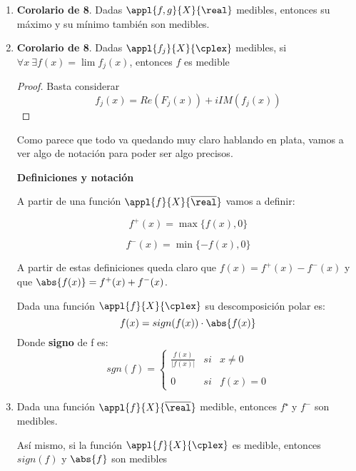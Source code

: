 \documentclass{apuntes}
\begin{document}
\begin{enumerate}
\begin{proof}
\begin{enumerate}
\item $g_2(x) = - \sup\{f_j(x)\}$

\item $g_3(x) = \limsup f_j(x) = \lim_n \sup_{j \geq n}\{f_j(x)\}=\inf_n \sup_{j \geq n}\{f_j(x)\}$ es medible
\end{enumerate}
\end{proof}
\item \textbf{Corolario de 8}. Dadas $\appl{f,g}{X}{\real}$ medibles, entonces su máximo y su mínimo también son medibles.

\item \textbf{Corolario de 8}. Dadas $\appl{f_j}{X}{\cplex}$ medibles, si $\forall x \ \exists f(x)=\lim f_j(x)$, entonces $f$ es medible
\begin{proof}
Basta considerar
\[f_j(x) = Re(F_j(x))+ i IM(f_j(x))\]
\end{proof}

Como parece que todo va quedando muy claro hablando en plata, vamos a ver algo de notación para poder ser algo precisos.

\textbf{Definiciones y notación}

A partir de una función $\appl{f}{X}{\overline{\real}}$ vamos a definir:

\begin{defn}[.$f^+(x)$]
\[f^+(x)=\max \{f(x), 0\}\]
\end{defn}

\begin{defn}[.$f^-(x)$]
\[f^-(x)=\min \{-f(x), 0\}\]
\end{defn}

A partir de estas definiciones queda claro que $f(x)=f^+(x)-f^-(x)$ y que $\abs{f(x)}=f^+(x)+f^-(x)$.
\newpage
\begin{defn}
Dada una función $\appl{f}{X}{\cplex}$ su descomposición polar es:
\[f(x)=sign(f(x))\cdot\abs{f(x)}\]
Donde \textbf{signo} de f es:
\[sgn(f)=\left\{ \begin{array}{lcc}
             \frac{f(x)}{|f(x)|} &   si  & x \neq 0 \\
             \\ 0 &  si  & f(x) = 0
             \end{array}
   \right.\]
\end{defn}

\item Dada una función $\appl{f}{X}{\overline{\real}}$ medible, entonces $f⁺$ y $f^-$ son medibles.

Así mismo, si la función $\appl{f}{X}{\cplex}$ es medible, entonces $sign(f)$ y $\abs{f}$ son medibles


\end{enumerate}
\end{document}
